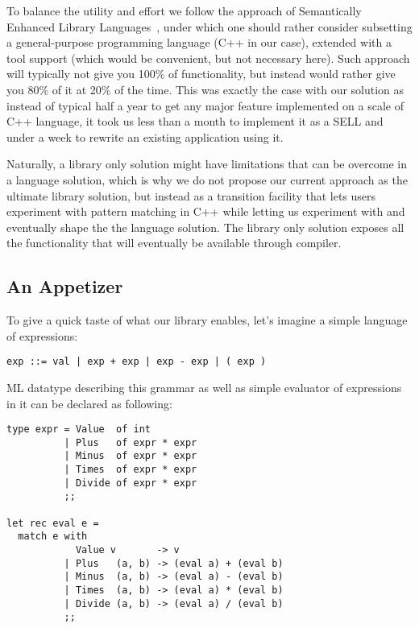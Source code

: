 \documentclass[submission,copyright]{eptcs}
\begin{document}
To balance the utility and effort we follow the approach of Semantically 
Enhanced Library Languages~\cite{SELL}, under which one should rather consider 
subsetting a general-purpose programming language (C++ in our case), extended 
with a tool support (which would be convenient, but not necessary here). Such 
approach will typically not give you 100\% of functionality, but instead would 
rather give you 80\% of it at 20\% of the time. This was exactly the case with 
our solution as instead of typical half a year to get any major feature 
implemented on a scale of C++ language, it took us less than a month to 
implement it as a SELL and under a week to rewrite an existing application using 
it.

Naturally, a library only solution might have limitations that can be overcome in 
a language solution, which is why we do not propose our current approach as the 
ultimate library solution, but instead as a transition facility that lets users 
experiment with pattern matching in C++ while letting us experiment with and 
eventually shape the the language solution. The library only solution exposes 
all the functionality that will eventually be available through compiler.

\subsection{An Appetizer}

To give a quick taste of what our library enables, let's imagine a simple 
language of expressions:

\begin{lstlisting}
exp ::= val | exp + exp | exp - exp | ( exp )
\end{lstlisting}

ML datatype describing this grammar as well as simple evaluator of expressions 
in it can be declared as following:

\begin{lstlisting}
type expr = Value  of int
          | Plus   of expr * expr
          | Minus  of expr * expr
          | Times  of expr * expr
          | Divide of expr * expr
          ;;

let rec eval e =
  match e with
            Value v       -> v
          | Plus   (a, b) -> (eval a) + (eval b)
          | Minus  (a, b) -> (eval a) - (eval b)
          | Times  (a, b) -> (eval a) * (eval b)
          | Divide (a, b) -> (eval a) / (eval b)
          ;;
\end{lstlisting}
\end{document}
